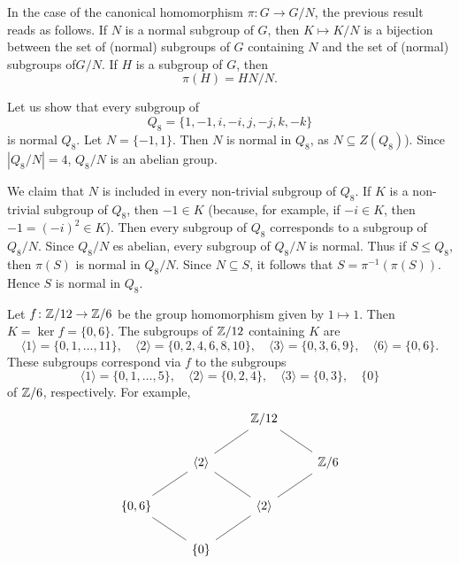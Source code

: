 In the case of the canonical homomorphism $\pi\colon
 G\to G/N$, the previous result reads as follows. 
If $N$ is a normal subgroup of $G$, then
$K\mapsto K/N$ is a bijection between the set of 
(normal) subgroups of $G$ containing $N$ and the 
set of (normal) subgroups of$G/N$.
If $H$ is a subgroup of $G$, then
\[
\pi(H)=HN/N.
\]
\begin{example}
Let us show that every subgroup of 
\[
Q_8=\{1,-1,i,-i,j,-j,k,-k\}
\]
is normal $Q_8$. Let $N=\{-1,1\}$. Then $N$ is normal in $Q_8$, as $N\subseteq Z(Q_8)$). Since $|Q_8/N|=4$, 
$Q_8/N$ is an abelian group. 

We claim that $N$ is included in every non-trivial 
subgroup of $Q_8$. If 
$K$ is a non-trivial subgroup of $Q_8$, then $-1\in K$ (because, for example, if $-i\in K$, then
 $-1=(-i)^2\in K$).
Then every subgroup of $Q_8$ corresponds to a subgroup of $Q_8/N$. 
Since $Q_8/N$ es abelian, every subgroup of $Q_8/N$ is normal. Thus 
if $S\leq Q_8$, then 
$\pi(S)$ is normal in $Q_8/N$.
Since $N\subseteq S$, it follows that
$S=\pi^{-1}(\pi(S))$. Hence $S$ is normal in $Q_8$.
\end{example}


\begin{example}
Let $f\colon\mathbb{Z}/12\to\mathbb{Z}/6$ be the group homomorphism given by 
$1\mapsto 1$. Then $K=\ker f=\{0,6\}$.
The subgroups of $\mathbb{Z}/12$ containing $K$ are
\[
\langle 1\rangle=\{0,1,\dots,11\},
\quad
\langle 2\rangle=\{0,2,4,6,8,10\},
\quad
\langle 3\rangle=\{0,3,6,9\},
\quad
\langle 6\rangle=\{0,6\}.
\]
These subgroups correspond via $f$ to
the subgroups
\[
\langle 1\rangle=\{0,1,\dots,5\},
\quad
\langle 2\rangle=\{0,2,4\},
\quad
\langle 3\rangle=\{0,3\},
\quad
\{0\}
\]
of $\mathbb{Z}/6$, respectively. 
For example, 
\[
\begin{tikzcd}
        && \Z/12 \\
        & \langle 2\rangle && {\Z/6} \\
        \{0,6\} && \langle 2\rangle \\
        & {\{0\}}
        \arrow[no head, from=1-3, to=2-4]
        \arrow[no head, from=1-3, to=2-2]
        \arrow[no head, from=2-2, to=3-1]
        \arrow[no head, from=3-1, to=4-2]
        \arrow[no head, from=2-2, to=3-3]
        \arrow[no head, from=3-3, to=4-2]
        \arrow[no head, from=2-4, to=3-3]
\end{tikzcd}
\]
\end{example}

